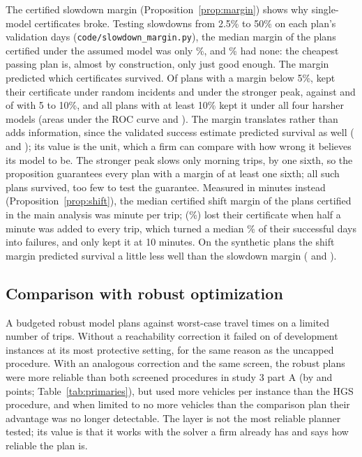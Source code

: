 \documentclass[11pt,a4paper]{article}
\theoremstyle{remark}
\begin{document}
The certified slowdown margin (Proposition~\ref{prop:margin}) shows why
single-model certificates broke. Testing slowdowns from 2.5\% to 50\% on each plan's
validation days (\texttt{code/slowdown\_margin.py}), the median margin of the
\SmPlans{} plans certified under the assumed model was only \SmMedian\%, and
\SmZeroShare\% had none: the cheapest passing plan is, almost by construction, only
just good enough. The margin predicted which certificates survived. Of \SmLowN{}
plans with a margin below 5\%, \SmLowInc{} kept their certificate under random
incidents and \SmLowPeak{} under the stronger peak, against \SmMidInc{} and
\SmMidPeak{} of \SmMidN{} with 5 to 10\%, and all \SmHighN{} plans with at least 10\%
kept it under all four harsher models (areas under the ROC curve \SmAucInc{} and
\SmAucPeak). The margin translates rather than adds information, since the
validated success estimate predicted survival as well (\SmAucValInc{} and
\SmAucValPeak); its value is the unit, which a firm can compare with how wrong it
believes its model to be. The stronger peak slows only morning trips, by one sixth,
so the proposition guarantees every plan with a margin of at least one sixth; all
\SmCovered{} such plans survived, too few to test the guarantee. Measured in minutes
instead (Proposition~\ref{prop:shift}), the median certified shift margin of the
\ShPlans{} plans certified in the main analysis was \ShMedian{} minute per trip; \ShZero{}
(\ShZeroShare\%) lost their certificate when half a minute was added to every trip, which
turned a median \ShRhoHalf\% of their successful days into failures, and only \ShTen{}
kept it at 10 minutes. On the synthetic plans the shift margin predicted survival a
little less well than the slowdown margin (\ShAucInc{} and \ShAucPeak).



\subsection{Comparison with robust optimization}

A budgeted robust model plans against worst-case travel times on a limited number of
trips. Without a reachability correction it failed on \RobNoPlanBoxSix{} of
\RobInstances{} development instances at its most protective setting, for the same
reason as the uncapped procedure. With an analogous correction and the same screen,
the robust plans were more reliable than both screened procedures in study 3 part A
(by \PaROne{} and \PaRTwo{} points; Table~\ref{tab:primaries}), but used \PaRThree{}
more vehicles per instance than the HGS procedure, and when limited to no more
vehicles than the comparison plan their advantage was no longer detectable. The layer
is not the most reliable planner tested; its value is that it works with the solver a
firm already has and says how reliable the plan is.
\end{document}

